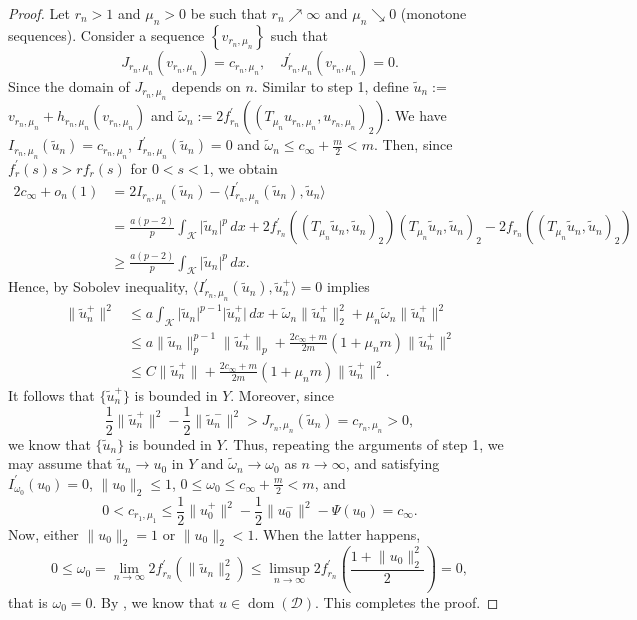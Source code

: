 \documentclass[11pt]{amsart}
\newcommand{\abs}[1]{\lvert#1\rvert}
\newcommand{\norm}[1]{\lVert#1\rVert}
\newcommand{\D}{\mathcal{D}}
\newcommand{\K}{\mathcal{K}}
\numberwithin{equation}{section}
\begin{document}
\begin{proof}
Let $r_{n}>1$ and $\mu_{n}>0$ be such that $r_{n} \nearrow \infty$ and $\mu_{n} \searrow 0$ (monotone sequences).  Consider a sequence $\left\{v_{r_{n}, \mu_{n}}\right\}$ such that
$$
J_{r_{n}, \mu_{n}}\left(v_{r_{n}, \mu_{n}}\right)=c_{r_{n}, \mu_{n}}, \quad J_{r_{n}, \mu_{n}}^{\prime}\left(v_{r_{n}, \mu_{n}}\right)=0.
$$
Since the domain of $J_{r_{n}, \mu_{n}}$ depends on $n$. Similar to step 1, define $\tilde{u}_n := $ $v_{r_{n}, \mu_{n}}+h_{r_{n}, \mu_{n}}\left(v_{r_{n}, \mu_{n}}\right)$ and $\tilde{\omega}_{n}:=2 f_{r_{n}}^{\prime}((T_{\mu_{n}} u_{r_{n}, \mu_{n}}, u_{r_{n},\mu_{n}})_{2})$. We have $I_{r_{n}, \mu_{n}}(\tilde{u}_n)=c_{r_n, \mu_n}$, $I_{r_{n}, \mu_{n}}^{\prime}(\tilde{u}_n)=0$ and $\tilde{\omega}_{n} \leq c_{\infty}+\frac{m}{2}<m$.
Then, since $f_r^{\prime}(s)s > rf_r(s)$ for $0 < s < 1$, we obtain
$$
\begin{aligned}
2c_\infty + o_n(1) &= 2I_{r_{n}, \mu_{n}}(\tilde{u}_n) - \langle I_{r_{n}, \mu_{n}}^{\prime}(\tilde{u}_n),\tilde{u}_n\rangle  \\
&= \frac{a(p-2)}{p}\int_{\K}\abs{\tilde{u}_n}^p\, dx + 2f_{r_n}^{\prime}((T_{\mu_n} \tilde{u}_n,\tilde{u}_n)_2)(T_{\mu_n} \tilde{u}_n, \tilde{u}_n)_2 - 2f_{r_n}((T_{\mu_n} \tilde{u}_n, \tilde{u}_n)_2)\\
& \geq \frac{a(p-2)}{p}\int_{\K}\abs{\tilde{u}_n}^p\, dx.
\end{aligned}
$$
Hence, by Sobolev inequality, $\langle I_{r_{n}, \mu_{n}}^{\prime}(\tilde{u}_n),\tilde{u}_n^+ \rangle = 0$ implies
\[
\begin{aligned}
        \norm{\tilde{u}_n^+}^2 &\leq a\int_{\K}\abs{\tilde{u}_n}^{p-1}\abs{\tilde{u}_n^+}\, dx + \tilde{\omega}_n\norm{\tilde{u}_n^+}_2^2 + \mu_n\tilde{\omega}_n\norm{\tilde{u}_n^+}^2\\
        & \leq a\norm{\tilde{u}_n}_p^{p-1}\norm{\tilde{u}_n^+}_p + \frac{2c_{\infty}+m}{2m}(1+\mu_nm)\norm{\tilde{u}_n^+}^2 \\
        &\leq C\norm{\tilde{u}_n^+} + \frac{2c_{\infty}+m}{2m}(1+\mu_nm)\norm{\tilde{u}_n^+}^2.
\end{aligned}
\]
It follows that $\{\tilde{u}_n^+\}$ is bounded in $Y$. Moreover, since
\[
\frac{1}{2}\norm{\tilde{u}_n^+}^2 - \frac{1}{2}\norm{\tilde{u}_n^-}^2 > J_{r_n,\mu_n}(\tilde{u}_n) = c_{r_n,\mu_n} > 0,
\]
we know that $\{\tilde{u}_n\}$ is bounded in $Y$.
Thus, repeating the arguments of step 1, we may assume that $\tilde{u}_n \to u_{0}$ in $Y$ and $\tilde{\omega}_n \rightarrow \omega_{0}$ as $n \rightarrow \infty$, and satisfying
$I_{\omega_0}^{\prime}(u_0) = 0$, $\norm{u_{0}}_{2} \leq 1$, $0 \leq \omega_{0} \leq c_{\infty}+\frac{m}{2} < m$, and
$$
0<c_{r_{1}, \mu_{1}} \leq \frac{1}{2}\norm{u_0^+}^2 - \frac{1}{2}\norm{u_0^-}^2-\Psi(u_{0})=c_{\infty}.
$$
Now, either $\norm{u_{0}}_{2}=1$ or $\norm{u_{0}}_{2}<1$. When the latter happens,
$$
0 \leq \omega_{0}=\lim _{n \rightarrow \infty} 2f_{r_{n}}^{\prime}(\norm{\tilde{u}_n}_{2}^{2}) \leq \limsup _{n \rightarrow \infty} 2f_{r_{n}}^{\prime}\left(\frac{1+\norm{u_{0}}_{2}^{2}}{2}\right)=0,
$$
that is $\omega_{0}=0$. By \cite[Proposition 3.1]{Bo}, we know that $u \in \operatorname{dom}(\D)$. This completes the proof.
\end{proof}
\end{document}
